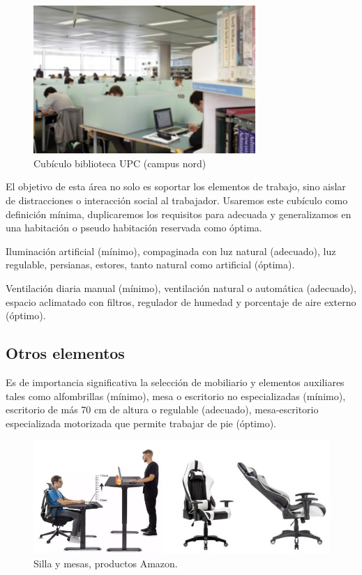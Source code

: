 \begin{figure}[htb]
\begin{center}
\includegraphics[width=0.75\textwidth]{./figuras/cubiculo_upc}
\caption{Cubículo biblioteca UPC (campus nord)}
\label{F:cubiculo_upc}
\end{center}
\end{figure}

El objetivo de esta área no solo es soportar los elementos de trabajo, sino aislar de distracciones o interacción social al trabajador. Usaremos este cubículo como definición mínima, duplicaremos los requisitos para adecuada y generalizamos en una habitación o pseudo habitación reservada como óptima.

Iluminación artificial (mínimo), compaginada con luz natural (adecuado), luz regulable, persianas, estores, tanto natural como artificial (óptima).

 Ventilación diaria manual (mínimo), ventilación natural o automática (adecuado), espacio aclimatado con filtros, regulador de humedad y porcentaje de aire externo (óptimo).

 \subsection{Otros elementos}

 Es de importancia significativa la selección de mobiliario y elementos auxiliares tales como alfombrillas (mínimo), mesa o escritorio no especializadas (mínimo), escritorio de más 70 cm de altura o regulable (adecuado), mesa-escritorio especializada motorizada que permite trabajar de pie (óptimo).

\begin{figure}[htb]
\begin{center}
\includegraphics[width=1\textwidth]{./figuras/amazon_sillas}
\caption{Silla y mesas, productos Amazon.}
\label{F:amazon_sillas}
\end{center}
\end{figure}


